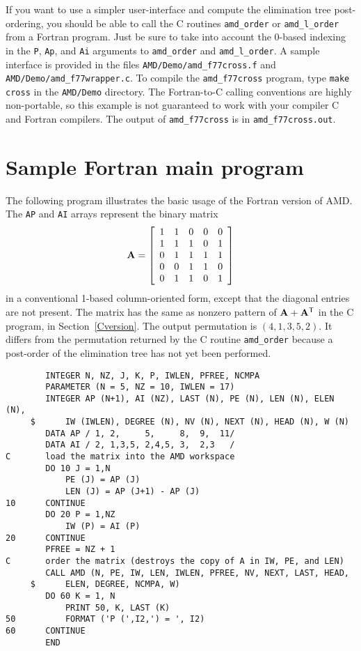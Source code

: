 \documentclass[11pt]{article}
\newcommand{\m}[1]{{\bf{#1}}}       %
\newcommand{\tr}{^{\sf T}}          %
\begin{document}
If you want to use a simpler user-interface and compute the elimination
tree post-ordering, you should be able to call the C routines {\tt amd\_order}
or {\tt amd\_l\_order} from a Fortran program.   Just be sure to take into
account the 0-based indexing in the {\tt P}, {\tt Ap}, and {\tt Ai} arguments
to {\tt amd\_order} and {\tt amd\_l\_order}.  A sample interface is provided
in the files {\tt AMD/Demo/amd\_f77cross.f} and
{\tt AMD/Demo/amd\_f77wrapper.c}.  To compile the {\tt amd\_f77cross} program,
type {\tt make cross} in the {\tt AMD/Demo} directory.  The
Fortran-to-C calling conventions are highly non-portable, so this example
is not guaranteed to work with your compiler C and Fortran compilers.
The output of {\tt amd\_f77cross} is in {\tt amd\_f77cross.out}.

\section{Sample Fortran main program}

The following program illustrates the basic usage of the Fortran version of AMD.
The {\tt AP} and {\tt AI} arrays represent the binary matrix
\[
\m{A} = \left[
\begin{array}{rrrrr}
 1 &  1 &  0 &  0 &  0 \\
 1 &  1 &  1 &  0 &  1 \\
 0 &  1 &  1 &  1 &  1 \\
 0 &  0 &  1 &  1 &  0 \\
 0 &  1 &  1 &  0 &  1 \\
\end{array}
\right]
\]
in a conventional 1-based column-oriented form,
except that the diagonal entries are not present.
The matrix has the same as nonzero pattern of $\m{A}+\m{A}\tr$ in the C
program, in Section~\ref{Cversion}.
The output permutation is $(4, 1, 3, 5, 2)$.
It differs from the permutation returned by the C routine {\tt amd\_order}
because a post-order of the elimination tree has not yet been performed.

{\footnotesize
\begin{verbatim}
        INTEGER N, NZ, J, K, P, IWLEN, PFREE, NCMPA
        PARAMETER (N = 5, NZ = 10, IWLEN = 17)
        INTEGER AP (N+1), AI (NZ), LAST (N), PE (N), LEN (N), ELEN (N),
     $      IW (IWLEN), DEGREE (N), NV (N), NEXT (N), HEAD (N), W (N)
        DATA AP / 1, 2,     5,     8,  9,  11/
        DATA AI / 2, 1,3,5, 2,4,5, 3,  2,3   /
C       load the matrix into the AMD workspace
        DO 10 J = 1,N
            PE (J) = AP (J)
            LEN (J) = AP (J+1) - AP (J)
10      CONTINUE
        DO 20 P = 1,NZ
            IW (P) = AI (P)
20      CONTINUE
        PFREE = NZ + 1
C       order the matrix (destroys the copy of A in IW, PE, and LEN)
        CALL AMD (N, PE, IW, LEN, IWLEN, PFREE, NV, NEXT, LAST, HEAD,
     $      ELEN, DEGREE, NCMPA, W)
        DO 60 K = 1, N
            PRINT 50, K, LAST (K)
50          FORMAT ('P (',I2,') = ', I2)
60      CONTINUE
        END
\end{verbatim}
}
\end{document}
